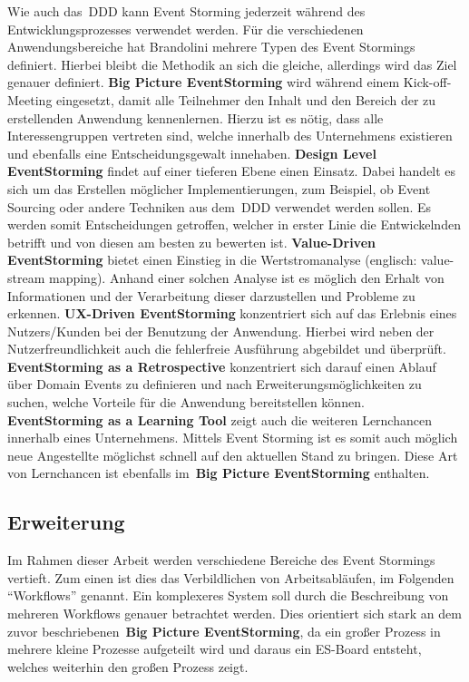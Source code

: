Wie auch das~\ac{DDD} kann Event Storming jederzeit während des Entwicklungsprozesses verwendet werden.
Für die verschiedenen Anwendungsbereiche hat Brandolini mehrere Typen des Event Stormings definiert\cite*{introES}.
Hierbei bleibt die Methodik an sich die gleiche, allerdings wird das Ziel genauer definiert.\newline
\textbf{Big Picture EventStorming} wird während einem Kick-off-Meeting eingesetzt, damit alle Teilnehmer den Inhalt und den Bereich der zu erstellenden Anwendung kennenlernen.
Hierzu ist es nötig, dass alle Interessengruppen vertreten sind, welche innerhalb des Unternehmens existieren und ebenfalls eine Entscheidungsgewalt innehaben.\newline
\textbf{Design Level EventStorming} findet auf einer tieferen Ebene einen Einsatz.
Dabei handelt es sich um das Erstellen möglicher Implementierungen, zum Beispiel, ob Event Sourcing oder andere Techniken aus dem~\ac{DDD} verwendet werden sollen.
Es werden somit Entscheidungen getroffen, welcher in erster Linie die Entwickelnden betrifft und von diesen am besten zu bewerten ist.\newline
\textbf{Value-Driven EventStorming} bietet einen Einstieg in die Wertstromanalyse (englisch: value-stream mapping).
Anhand einer solchen Analyse ist es möglich den Erhalt von Informationen und der Verarbeitung dieser darzustellen und Probleme zu erkennen.\newline
\textbf{UX-Driven EventStorming} konzentriert sich auf das Erlebnis eines Nutzers/Kunden bei der Benutzung der Anwendung.
Hierbei wird neben der Nutzerfreundlichkeit auch die fehlerfreie Ausführung abgebildet und überprüft.\newline
\textbf{EventStorming as a Retrospective} konzentriert sich darauf einen Ablauf über Domain Events zu definieren und nach
Erweiterungsmöglichkeiten zu suchen, welche Vorteile für die Anwendung bereitstellen können.\newline
\textbf{EventStorming as a Learning Tool} zeigt auch die weiteren Lernchancen innerhalb eines Unternehmens.
Mittels Event Storming ist es somit auch möglich neue Angestellte möglichst schnell auf den aktuellen Stand zu bringen.
Diese Art von Lernchancen ist ebenfalls im~\textbf{Big Picture EventStorming} enthalten.

\subsection{Erweiterung}\label{subsec:erweiterung}
Im Rahmen dieser Arbeit werden verschiedene Bereiche des Event Stormings vertieft.
Zum einen ist dies das Verbildlichen von Arbeitsabläufen, im Folgenden ``Workflows'' genannt.
Ein komplexeres System soll durch die Beschreibung von mehreren Workflows genauer betrachtet werden.
Dies orientiert sich stark an dem zuvor beschriebenen~\textbf{Big Picture EventStorming}, da ein großer Prozess in mehrere kleine
Prozesse aufgeteilt wird und daraus ein \ac{ES}-Board entsteht, welches weiterhin den großen Prozess zeigt.

